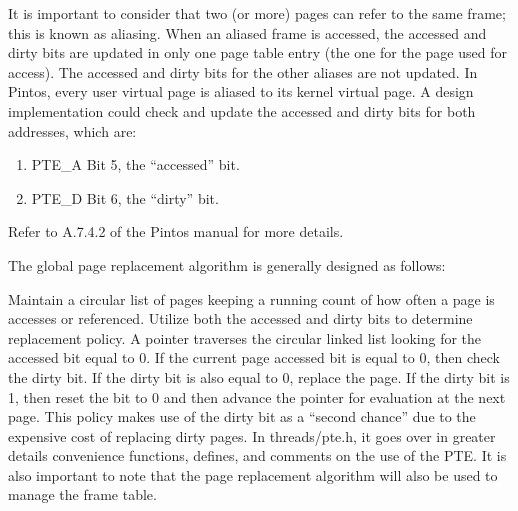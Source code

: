 \documentclass[11pt, letterpaper]{article}
\begin{document}
It is important to consider that two (or more) pages can refer to the same frame; this is known as aliasing. When an aliased frame is accessed, the accessed and dirty bits are updated in only one page table entry (the one for the page used for access). The accessed and dirty bits for the other aliases are not updated. In Pintos, every user virtual page is aliased to its kernel virtual page. A design implementation could check and update the accessed and dirty bits for both addresses, which are:
\begin{enumerate}
\item PTE\_A Bit 5, the “accessed” bit.
\item PTE\_D Bit 6, the “dirty” bit. 
\end{enumerate}

Refer to A.7.4.2 of the Pintos manual for more details.

The global page replacement algorithm is generally designed as follows: 
    
Maintain a circular list of pages keeping a running count of how often a page is  accesses or referenced. Utilize both the accessed and dirty bits to determine replacement policy. A pointer traverses the circular linked list looking for the accessed bit equal to 0. If the current page accessed bit is equal to 0, then check the dirty bit. If the dirty bit is also equal to 0, replace the page. If the dirty bit is 1, then reset the bit to 0 and then advance the pointer for evaluation at the next page. This policy makes use of the dirty bit as a “second chance” due to the expensive cost of replacing dirty pages.  In threads/pte.h, it goes over in greater details convenience functions, defines, and comments on the use of the PTE.
    It is also important to note that the page replacement algorithm will also be used 
to manage the frame table.
\end{document}
